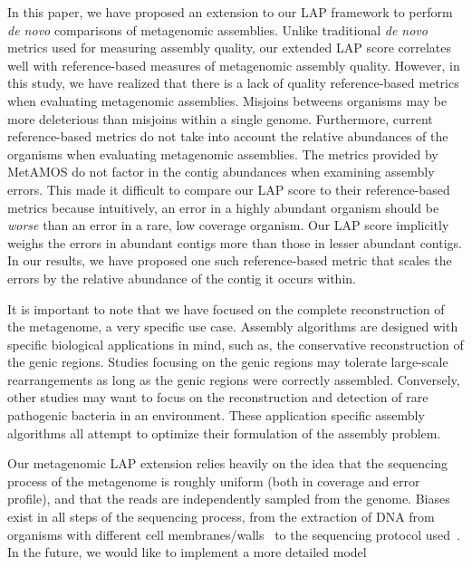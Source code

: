 \documentclass[conference]{IEEEtran}
\begin{document}
In this paper, we have proposed an extension to our LAP framework to perform \emph{de novo} comparisons of metagenomic assemblies.
Unlike traditional \emph{de novo} metrics used for measuring assembly quality, our extended LAP score correlates well with reference-based measures of metagenomic assembly quality.
However, in this study, we have realized that there is a lack of quality reference-based metrics when evaluating metagenomic assemblies.
Misjoins betweens organisms may be more deleterious than misjoins within a single genome.
Furthermore, current reference-based metrics do not take into account the relative abundances of the organisms when evaluating metagenomic assemblies.
The metrics provided by MetAMOS do not factor in the contig abundances when examining assembly errors.
This made it difficult to compare our LAP score to their reference-based metrics because intuitively, an error in a highly abundant organism should be \emph{worse} than an error in a rare, low coverage organism.
Our LAP score implicitly weighs the errors in abundant contigs more than those in lesser abundant contigs.
In our results, we have proposed one such reference-based metric that scales the errors by the relative abundance of the contig it occurs within.

It is important to note that we have focused on the complete reconstruction of the metagenome, a very specific use case.
Assembly algorithms are designed with specific biological applications in mind, such as, the conservative reconstruction of the genic regions.
Studies focusing on the genic regions may tolerate large-scale rearrangements as long as the genic regions were correctly assembled.
Conversely, other studies may want to focus on the reconstruction and detection of rare pathogenic bacteria in an environment.
These application specific assembly algorithms all attempt to optimize their formulation of the assembly problem.

Our metagenomic LAP extension relies heavily on the idea that the sequencing process of the metagenome is roughly uniform (both in coverage and error profile), and that the reads are independently sampled from the genome.
Biases exist in all steps of the sequencing process, from the extraction of DNA from organisms with different cell membranes/walls~\cite{carrigg2007dna,krsek1999comparison} to the sequencing protocol used~\cite{morgan2010metagenomic,temperton2009bias,darling2004mauve}.
In the future, we would like to implement a more detailed model

\end{document}
